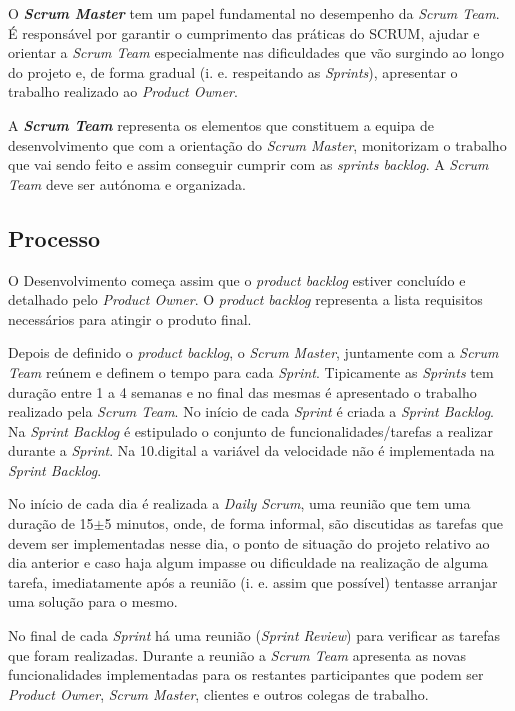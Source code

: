 O \textbf{\textit{Scrum Master}} tem um papel fundamental no desempenho da \textit{Scrum Team}. É responsável por garantir o cumprimento das práticas do SCRUM, ajudar e orientar a \textit{Scrum Team} especialmente nas dificuldades que vão surgindo ao longo do projeto e, de forma gradual (i. e. respeitando as \textit{Sprints}), apresentar o trabalho realizado ao \textit{Product Owner}.

A \textbf{\textit{Scrum Team}} representa os elementos que constituem a equipa de desenvolvimento que com a orientação do \textit{Scrum Master}, monitorizam o trabalho que vai sendo feito e assim conseguir cumprir com as \textit{sprints backlog}. A \textit{Scrum Team} deve ser autónoma e organizada. 

\subsection{Processo}

O Desenvolvimento começa assim que o \textit{product backlog} estiver concluído e detalhado pelo \textit{Product Owner}. O \textit{product backlog} representa a lista requisitos necessários para atingir o produto final. 

Depois de definido o \textit{product backlog}, o \textit{Scrum Master}, juntamente com a \textit{Scrum Team} reúnem e definem o tempo para cada \textit{Sprint}. Tipicamente as \textit{Sprints} tem duração entre 1 a 4 semanas e no final das mesmas é apresentado o trabalho realizado pela \textit{Scrum Team}. No início de cada \textit{Sprint} é criada a \textit{Sprint Backlog}. Na \textit{Sprint Backlog} é estipulado o conjunto de funcionalidades/tarefas a realizar durante a \textit{Sprint}. Na 10.digital a variável da velocidade não é implementada na \textit{Sprint Backlog}.

No início de cada dia é realizada a \textit{Daily Scrum}, uma reunião que tem uma duração de 15$\pm$5 minutos, onde, de forma informal, são discutidas as tarefas que devem ser implementadas nesse dia, o ponto de situação do projeto relativo ao dia anterior e caso haja algum impasse ou dificuldade na realização de alguma tarefa, imediatamente após a reunião (i. e. assim que possível) tentasse arranjar uma solução para o mesmo. 

No final de cada \textit{Sprint} há uma reunião (\textit{Sprint Review}) para verificar as tarefas que foram realizadas. Durante a reunião a \textit{Scrum Team} apresenta as novas funcionalidades implementadas para os restantes participantes que podem ser \textit{Product Owner}, \textit{Scrum Master}, clientes e outros colegas de trabalho. 


